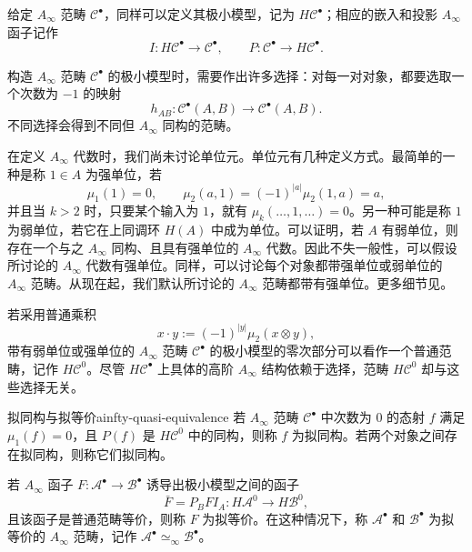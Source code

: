 给定 $A_\infty$ 范畴 $\mathcal C^\bullet$，同样可以定义其极小模型，记为 $H\mathcal C^\bullet$；相应的嵌入和投影 $A_\infty$ 函子记作
\[
  I\colon H\mathcal C^\bullet\to\mathcal C^\bullet,\qquad
  P\colon\mathcal C^\bullet\to H\mathcal C^\bullet.
\]

\begin{note}
构造 $A_\infty$ 范畴 $\mathcal C^\bullet$ 的极小模型时，需要作出许多选择：对每一对对象，都要选取一个次数为 $-1$ 的映射
\[
  h_{AB}\colon\mathcal C^\bullet(A,B)\to\mathcal C^\bullet(A,B).
\]
不同选择会得到不同但 $A_\infty$ 同构的范畴。
\end{note}

\begin{note}
在定义 $A_\infty$ 代数时，我们尚未讨论单位元。单位元有几种定义方式。最简单的一种是称 $1\in A$ 为强单位，若
\[
  \mu_1(1)=0,\qquad
  \mu_2(a,1)=(-1)^{|a|}\mu_2(1,a)=a,
\]
并且当 $k>2$ 时，只要某个输入为 $1$，就有 $\mu_k(\ldots,1,\ldots)=0$。另一种可能是称 $1$ 为弱单位，若它在上同调环 $H(A)$ 中成为单位。可以证明，若 $A$ 有弱单位，则存在一个与之 $A_\infty$ 同构、且具有强单位的 $A_\infty$ 代数。因此不失一般性，可以假设所讨论的 $A_\infty$ 代数有强单位。同样，可以讨论每个对象都带强单位或弱单位的 $A_\infty$ 范畴。从现在起，我们默认所讨论的 $A_\infty$ 范畴都带有强单位。更多细节见。

若采用普通乘积
\[
  x\cdot y:=(-1)^{|y|}\mu_2(x\otimes y),
\]
带有弱单位或强单位的 $A_\infty$ 范畴 $\mathcal C^\bullet$ 的极小模型的零次部分可以看作一个普通范畴，记作 $H\mathcal C^0$。尽管 $H\mathcal C^\bullet$ 上具体的高阶 $A_\infty$ 结构依赖于选择，范畴 $H\mathcal C^0$ 却与这些选择无关。
\end{note}

\begin{definition}{拟同构与拟等价}{ainfty-quasi-equivalence}
若 $A_\infty$ 范畴 $\mathcal C^\bullet$ 中次数为 $0$ 的态射 $f$ 满足 $\mu_1(f)=0$，且 $P(f)$ 是 $H\mathcal C^0$ 中的同构，则称 $f$ 为拟同构。若两个对象之间存在拟同构，则称它们拟同构。

若 $A_\infty$ 函子 $F\colon\mathcal A^\bullet\to\mathcal B^\bullet$ 诱导出极小模型之间的函子
\[
  \bar F=P_BFI_A\colon H\mathcal A^0\to H\mathcal B^0,
\]
且该函子是普通范畴等价，则称 $F$ 为拟等价。在这种情况下，称 $\mathcal A^\bullet$ 和 $\mathcal B^\bullet$ 为拟等价的 $A_\infty$ 范畴，记作 $\mathcal A^\bullet\simeq_\infty\mathcal B^\bullet$。
\end{definition}

